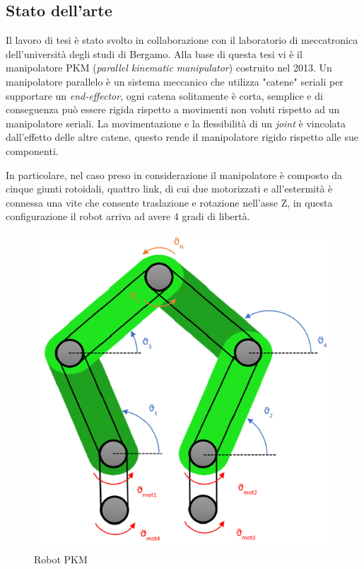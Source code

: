 \subsection{Stato dell'arte}
Il lavoro di tesi è stato svolto in collaborazione con il laboratorio di meccatronica dell'università degli studi di Bergamo. Alla base di questa tesi vi è il manipolatore PKM (\textit{parallel kinematic manipulator}) costruito nel 2013. Un manipolatore parallelo è un sistema meccanico che utilizza "catene" seriali per supportare un \textit{end-effector}, ogni catena solitamente è corta, semplice e di conseguenza può essere rigida rispetto a movimenti non voluti rispetto ad un manipolatore seriali. La movimentazione e la flessibilità di un \textit{joint} è vincolata dall'effetto delle altre catene, questo rende il manipolatore rigido rispetto alle sue componenti. 
\par In particolare, nel caso preso in considerazione il manipolatore è composto da cinque giunti rotoidali, quattro link, di cui due motorizzati e all'estermità è connessa una vite che consente traslazione e rotazione nell'asse Z, in questa configurazione il robot arriva ad avere 4 gradi di libertà.
\begin{figure}[ht]
	\begin{center}
		\includegraphics[scale=0.7]{Immagini/Robot1.png}
		\caption{Robot PKM 
		\label{fig:PKM}}
	\end{center}
\end{figure}
